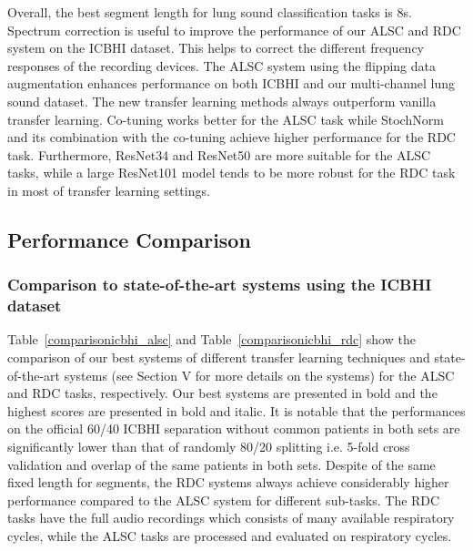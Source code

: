 \documentclass[journal]{IEEEtran}
\begin{document}
Overall, the best segment length for lung sound classification tasks is 8s. Spectrum correction is useful to improve the performance of our ALSC and RDC system on the ICBHI dataset. This helps to correct the different frequency responses of the recording devices. The ALSC system using the flipping data augmentation enhances performance on both ICBHI and our multi-channel lung sound dataset. The new transfer learning methods always outperform vanilla transfer learning. Co-tuning works better for the ALSC task while StochNorm and its combination with the co-tuning achieve higher performance for the RDC task. Furthermore, ResNet34 and ResNet50 are more suitable for the ALSC tasks, while a large ResNet101 model tends to be more robust for the RDC task in most of transfer learning settings.   

\subsection{Performance Comparison}
\subsubsection{Comparison to state-of-the-art systems using the ICBHI dataset}
Table~\ref{comparisonicbhi_alsc} and Table~\ref{comparisonicbhi_rdc} show the comparison of our best systems of different transfer learning techniques and state-of-the-art systems (see Section V for more details on the systems) for the ALSC and RDC tasks, respectively. Our best systems are presented in bold and the highest scores are presented in bold and italic. It is notable that the performances on the official 60/40 ICBHI separation without common patients in both sets are significantly lower than that of randomly 80/20 splitting i.e. 5-fold cross validation and overlap of the same patients in both sets. Despite of the same fixed length for segments, the RDC systems always achieve considerably higher performance compared to the ALSC system for different sub-tasks. The RDC tasks have the full audio recordings which consists of many available respiratory cycles, while the ALSC tasks are processed and evaluated on respiratory cycles. 
\end{document}
